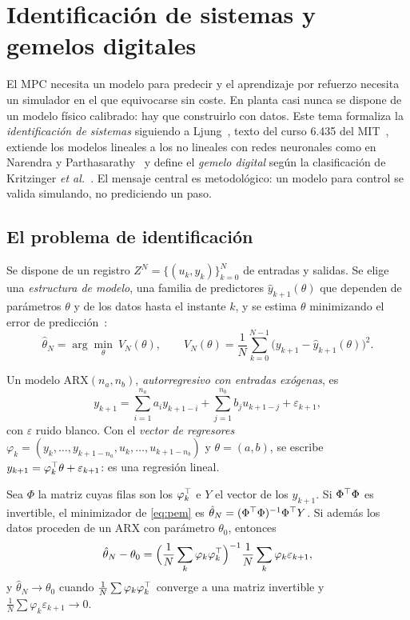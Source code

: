 \chapter{Identificación de sistemas y gemelos digitales}
\label{tema:2}

El MPC necesita un modelo para predecir y el aprendizaje por refuerzo necesita un simulador en el que equivocarse sin coste. En planta casi nunca se dispone de un modelo físico calibrado: hay que construirlo con datos. Este tema formaliza la \emph{identificación de sistemas} siguiendo a Ljung~\cite{ljung}, texto del curso 6.435 del MIT~\cite{mit6435}, extiende los modelos lineales a los no lineales con redes neuronales como en Narendra y Parthasarathy~\cite{narendra} y define el \emph{gemelo digital} según la clasificación de Kritzinger \emph{et al.}~\cite{kritzinger}. El mensaje central es metodológico: un modelo para control se valida simulando, no prediciendo un paso.

\section{El problema de identificación}

Se dispone de un registro $Z^{N}=\{(u_k,y_k)\}_{k=0}^{N}$ de entradas y salidas. Se elige una \emph{estructura de modelo}, una familia de predictores $\hat y_{k+1}(\theta)$ que dependen de parámetros $\theta$ y de los datos hasta el instante $k$, y se estima $\theta$ minimizando el error de predicción~\cite{ljung}:
\begin{equation}\label{eq:pem}
\hat\theta_N=\arg\min_\theta\ V_N(\theta),\qquad V_N(\theta)=\frac1N\sum_{k=0}^{N-1}\bigl(y_{k+1}-\hat y_{k+1}(\theta)\bigr)^{2}.
\end{equation}

\begin{definicion}\label{def:arx}
Un modelo ARX$(n_a,n_b)$, \emph{autorregresivo con entradas exógenas}, es
\[
y_{k+1}=\sum_{i=1}^{n_a}a_iy_{k+1-i}+\sum_{j=1}^{n_b}b_ju_{k+1-j}+\varepsilon_{k+1},
\]
con $\varepsilon$ ruido blanco. Con el \emph{vector de regresores} $\varphi_k=(y_k,\dots,y_{k+1-n_a},u_k,\dots,u_{k+1-n_b})$ y $\theta=(a,b)$, se escribe $y_{k+1}=\varphi_k^{\top}\theta+\varepsilon_{k+1}$: es una regresión lineal.
\end{definicion}

\begin{proposicion}\label{prop:ls}
Sea $\Phi$ la matriz cuyas filas son los $\varphi_k^{\top}$ e $Y$ el vector de los $y_{k+1}$. Si $\Phi^{\top}\Phi$ es invertible, el minimizador de \eqref{eq:pem} es $\hat\theta_N=(\Phi^{\top}\Phi)^{-1}\Phi^{\top} Y$. Si además los datos proceden de un ARX con parámetro $\theta_0$, entonces
\[
\hat\theta_N-\theta_0=\Bigl(\frac1N\sum_k\varphi_k\varphi_k^{\top}\Bigr)^{-1}\frac1N\sum_k\varphi_k\varepsilon_{k+1},
\]
y $\hat\theta_N\to\theta_0$ cuando $\frac1N\sum\varphi_k\varphi_k^{\top}$ converge a una matriz invertible y $\frac1N\sum\varphi_k\varepsilon_{k+1}\to0$.
\end{proposicion}

